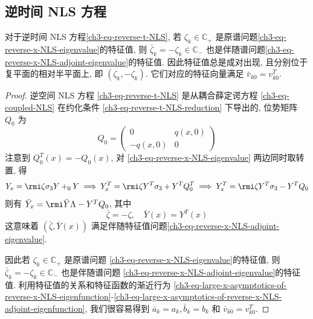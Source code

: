 \subsection{逆时间 NLS 方程}
\begin{theorem}\label{thm:NLS-inverse-t}
    对于逆时间 NLS 方程\eqref{ch3-eq-reverse-t-NLS}, 若 $ \zeta_{k} \in \mathbb{C}_{+} $ 是原谱问题\eqref{ch3-eq-reverse-x-NLS-eigenvalue}的特征值, 则 $ \bar{\zeta}_{k} = -\zeta_{k} \in \mathbb{C}_{-} $ 也是伴随谱问题\eqref{ch3-eq-reverse-x-NLS-adjoint-eigenvalue}的特征值. 因此特征值总是成对出现, 且分别位于复平面的相对半平面上, 即 $(\zeta_{k}, -\zeta_{k})$. 它们对应的特征向量满足 $ \bar{v}_{k0} = v_{k0}^{T} $.
\end{theorem}
\begin{proof}
    逆空间 NLS 方程 \eqref{ch3-eq-reverse-t-NLS} 是从耦合薛定谔方程 \eqref{ch3-eq-coupled-NLS} 在约化条件 \eqref{ch3-eq-reverse-t-NLS-reduction} 下导出的, 位势矩阵 $ Q_{0} $ 为
    \begin{equation}
        Q_{0} = \begin{pmatrix}
            0       & q(x,0) \\
            -q(x,0) & 0
        \end{pmatrix}
    \end{equation}
    注意到 $ Q_{0}^{T}(x) = -Q_{0}(x) $, 对 \eqref{ch3-eq-reverse-x-NLS-eigenvalue} 两边同时取转置, 得
    \begin{equation}
        Y_{x} = \rmi \zeta \sigma_{3} Y + _{0} Y \implies
        Y_{x}^{T} = \rmi \zeta Y^{T} \sigma_{3} + Y^{T} Q_{0}^{T} \implies
        Y_{x}^{T} = \rmi \zeta Y^{T} \sigma_{3} - Y^{T}Q_{0}
    \end{equation}
    则有 $ \bar{Y}_{x} = \rmi \bar{Y} \Lambda - Y^{T}Q_{0} $, 其中
    \begin{equation}
        \bar{\zeta} = -\zeta, \quad \bar{Y}(x) = Y^{T}(x)
    \end{equation}
    这意味着 $ (\bar{\zeta}, \bar{Y}(x)) $ 满足伴随特征值问题\eqref{ch3-eq-reverse-x-NLS-adjoint-eigenvalue}.

    因此若 $ \zeta_{k} \in \mathbb{C}_{+} $ 是原谱问题 \eqref{ch3-eq-reverse-x-NLS-eigenvalue}的特征值, 则 $ \bar{\zeta}_{k} = -\zeta_{k} \in \mathbb{C}_{-} $ 也是伴随谱问题 \eqref{ch3-eq-reverse-x-NLS-adjoint-eigenvalue}的特征值. 利用特征值的关系和特征函数的渐近行为 \eqref{ch3-eq-large-x-asymptotics-of-reverse-x-NLS-eigenfunction}-\eqref{ch3-eq-large-x-asymptotics-of-reverse-x-NLS-adjoint-eigenfunction}, 我们很容易得到 $ \bar{a}_{k} = a_{k}, \bar{b}_{k} = b_{k} $ 和 $ \bar{v}_{k0} = v_{k0}^{T} $.
\end{proof}
